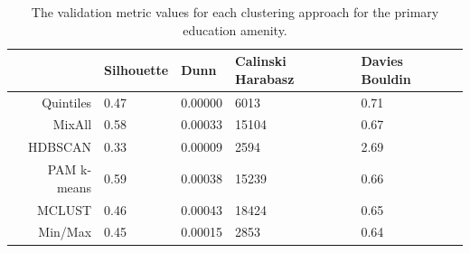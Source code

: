 \documentclass[11pt, a4paper]{article}
\begin{document}
\begin{table}[H]
\centering
\caption[Number of clusters by approach]{The number of clusters suggested by all approaches for each amenity in the PMD.}\label{numclusts}
\end{table}












\begin{longtable}[H]{|r|llll|}
\caption[Primary education validation metrics]{ The validation metric values for each clustering approach for the primary education amenity.}\label{prieducmetrics}
\endfirsthead
\endhead
  \hline
 & Silhouette & Dunn & Calinski Harabasz & Davies Bouldin \\
  \hline
Quintiles & 0.47 & 0.00000 &  6013 & 0.71 \\
   \hline
MixAll & 0.58 & 0.00033 & 15104 & 0.67 \\
   \hline
HDBSCAN & 0.33 & 0.00009 &  2594 & 2.69 \\
   \hline
PAM k-means & \cellcolor{gray!25} 0.59 & 0.00038 & 15239 & 0.66 \\
   \hline
MCLUST & 0.46 & \cellcolor{gray!25} 0.00043 & \cellcolor{gray!25} 18424 & 0.65 \\
   \hline
Min/Max & 0.45 & 0.00015 &  2853 & \cellcolor{gray!25} 0.64 \\
   \hline
\end{longtable}
\end{document}
